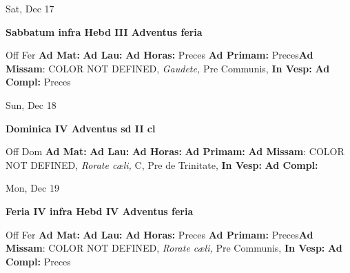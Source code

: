 \documentclass[10pt]{book}
\begin{document}
\begin{center}
\begin{minipage}{3.5in}
\vspace{2em}
\begin{center}Sat, Dec 17
\end{center}
\textbf{ \large Sabbatum infra Hebd III Adventus
\textnormal{\normalsize feria}}

\begin{justify}Off Fer
\textbf{Ad Mat: }
\textbf{Ad Lau: }
\textbf{Ad Horas: }Preces
\textbf{Ad Primam: }Preces\textbf{Ad Missam}: COLOR NOT DEFINED, \textit{Gaudete,} Pre Communis, 
\textbf{In Vesp: }
\textbf{Ad Compl: }Preces
\end{justify}
\end{minipage}
\end{center}

\begin{center}
\begin{minipage}{3.5in}
\vspace{2em}
\begin{center}Sun, Dec 18
\end{center}
\textbf{ \large Dominica IV Adventus
\textnormal{\normalsize sd II cl}}

\begin{justify}Off Dom
\textbf{Ad Mat: }
\textbf{Ad Lau: }
\textbf{Ad Horas: }
\textbf{Ad Primam: }\textbf{Ad Missam}: COLOR NOT DEFINED, \textit{Rorate cæli,} C, Pre de Trinitate, 
\textbf{In Vesp: }
\textbf{Ad Compl: }
\end{justify}
\end{minipage}
\end{center}

\begin{center}
\begin{minipage}{3.5in}
\vspace{2em}
\begin{center}Mon, Dec 19
\end{center}
\textbf{ \large Feria IV infra Hebd IV Adventus
\textnormal{\normalsize feria}}

\begin{justify}Off Fer
\textbf{Ad Mat: }
\textbf{Ad Lau: }
\textbf{Ad Horas: }Preces
\textbf{Ad Primam: }Preces\textbf{Ad Missam}: COLOR NOT DEFINED, \textit{Rorate cæli,} Pre Communis, 
\textbf{In Vesp: }
\textbf{Ad Compl: }Preces
\end{justify}
\end{minipage}
\end{center}
\end{document}
